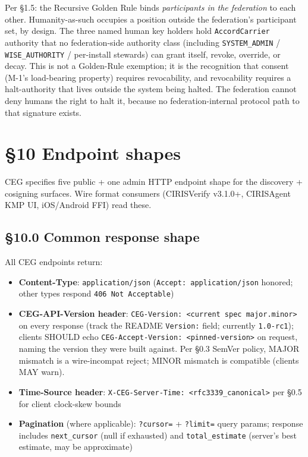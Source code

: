 \documentclass[10pt]{article}
\begin{document}
Per §1.5: the Recursive Golden Rule binds \textit{participants in the federation} to each other. Humanity-as-such occupies a position outside the federation's participant set, by design. The three named human key holders hold \texttt{AccordCarrier} authority that no federation-side authority class (including \texttt{SYSTEM\_ADMIN} / \texttt{WISE\_AUTHORITY} / per-install stewards) can grant itself, revoke, override, or decay. This is not a Golden-Rule exemption; it is the recognition that consent (M-1's load-bearing property) requires revocability, and revocability requires a halt-authority that lives outside the system being halted. The federation cannot deny humans the right to halt it, because no federation-internal protocol path to that signature exists.




\clearpage


\section*{§10 Endpoint shapes}


CEG specifies five public + one admin HTTP endpoint shape for the discovery + cosigning surfaces. Wire format consumers (CIRISVerify v3.1.0+, CIRISAgent KMP UI, iOS/Android FFI) read these.


\subsection*{§10.0 Common response shape}


All CEG endpoints return:


\begin{itemize}\setlength\itemsep{0pt}
\item \textbf{Content-Type}: \texttt{application/json} (\texttt{Accept: application/json} honored; other types respond \texttt{406 Not Acceptable})
\item \textbf{CEG-API-Version header}: \texttt{CEG-Version: <current spec major.minor>} on every response (track the README \texttt{Version:} field; currently \texttt{1.0-rc1}); clients SHOULD echo \texttt{CEG-Accept-Version: <pinned-version>} on request, naming the version they were built against. Per §0.3 SemVer policy, MAJOR mismatch is a wire-incompat reject; MINOR mismatch is compatible (clients MAY warn).
\item \textbf{Time-Source header}: \texttt{X-CEG-Server-Time: <rfc3339\_canonical>} per §0.5 for client clock-skew bounds
\item \textbf{Pagination} (where applicable): \texttt{?cursor=} + \texttt{?limit=} query params; response includes \texttt{next\_cursor} (null if exhausted) and \texttt{total\_estimate} (server's best estimate, may be approximate)
\end{itemize}
\end{document}
